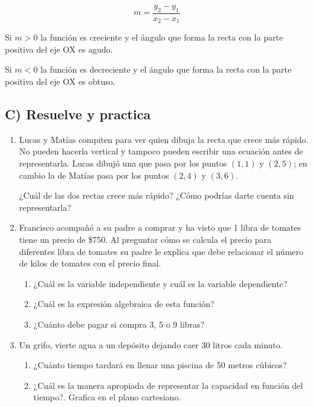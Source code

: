 \documentclass[12pt,a4paper]{article}
\begin{document}
$$m = \frac{y_2 - y_1}{x_2 - x_1}$$

Si $m > 0$ la función es creciente y el ángulo que forma la recta con la parte positiva del eje OX es agudo.

Si $m < 0$ la función es decreciente y el ángulo que forma la recta con la parte positiva del eje OX es obtuso.

\vspace{5mm}


\subsection*{C) Resuelve y practica}

\begin{enumerate}
\item Lucas y Matías compiten para ver quien dibuja la recta que crece más rápido. No pueden hacerla vertical y tampoco pueden escribir una ecuación antes de representarla. Lucas dibujó una que pasa por los puntos $(1,1)$ y $(2,5)$; en cambio la de Matías pasa por los puntos $(2,4)$ y $(3,6)$.

¿Cuál de las dos rectas crece más rápido? ¿Cómo podrías darte cuenta sin representarla?

\item Francisco acompañó a su padre a comprar y ha visto que 1 libra de tomates tiene un precio de \$750. Al preguntar cómo se calcula el precio para diferentes libra de tomates su padre le explica que debe relacionar el número de kilos de tomates con el precio final.

\begin{enumerate}[label=\alph*.]
\item ¿Cuál es la variable independiente y cuál es la variable dependiente?
\item ¿Cuál es la expresión algebraica de esta función?
\item ¿Cuánto debe pagar si compra 3, 5 o 9 libras?
\end{enumerate}

\item Un grifo, vierte agua a un depósito dejando caer 30 litros cada minuto.

\begin{enumerate}[label=\alph*.]
\item ¿Cuánto tiempo tardará en llenar una piscina de 50 metros cúbicos?
\item ¿Cuál es la manera apropiada de representar la capacidad en función del tiempo?. Grafica en el plano cartesiano.
\end{enumerate}


\end{enumerate}
\end{document}
